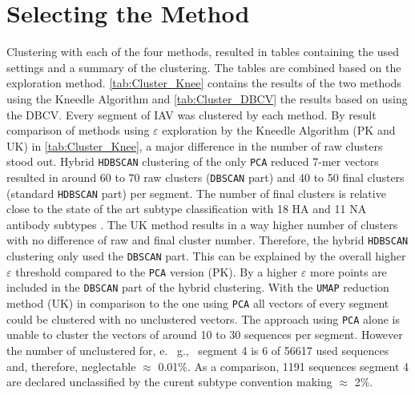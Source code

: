 \section{Selecting the Method} \label{sec:Clustering}

Clustering with each of the four methods, resulted in tables containing the used settings and a summary of the clustering. The tables are combined based on the exploration method. \autoref{tab:Cluster_Knee} contains the results of the two methods using the Kneedle Algorithm and \autoref{tab:Cluster_DBCV} the results based on using the \gls{DBCV}. Every segment of \gls{IAV} was clustered by each method. By result comparison of methods using $\varepsilon$ exploration by the Kneedle Algorithm (PK and UK) in \autoref{tab:Cluster_Knee}, a major difference in the number of raw clusters stood out. Hybrid \texttt{HDBSCAN} clustering of the only \texttt{PCA} reduced 7-mer vectors resulted in around 60 to 70 raw clusters (\texttt{DBSCAN} part) and 40 to 50 final clusters (standard \texttt{HDBSCAN} part) per segment. The number of final clusters is relative close to the state of the art subtype classification with 18 \gls{HA} and 11 \gls{NA} antibody subtypes \autocite{noauthor_revision_1980}. The UK method results in a way higher number of clusters with no difference of raw and final cluster number. Therefore, the hybrid \texttt{HDBSCAN} clustering only used the \texttt{DBSCAN} part. This can be explained by the overall higher $\varepsilon$ threshold compared to the \texttt{PCA} version (PK). By a higher $\varepsilon$ more points are included in the \texttt{DBSCAN} part of the hybrid clustering. With the \texttt{UMAP} reduction method (UK) in comparison to the one using \texttt{PCA} all vectors of every segment could be clustered with no unclustered vectors. The approach using \texttt{PCA} alone is unable to cluster the vectors of around 10 to 30 sequences per segment. However the number of unclustered for, e.~ g.,~ segment 4 is 6 of 56617 used sequences and, therefore, neglectable $\approx$ 0.01\%. As a comparison, 1191 sequences segment 4 are declared unclassified by the curent subtype convention making $\approx$ 2\%. 


